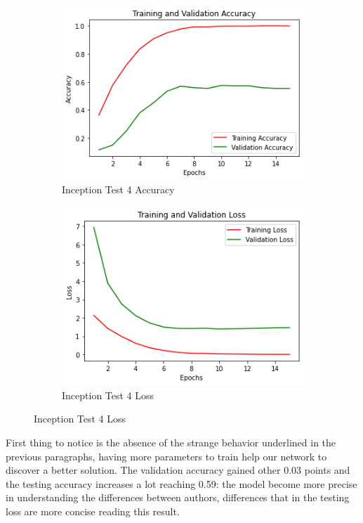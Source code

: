 \begin{figure}[H]
	\begin{subfigure}{0.5\textwidth}
		\includegraphics[width=0.9\linewidth]{img/inception/inceptionft3acc.png} 
		\caption{Inception Test 4 Accuracy}
		\label{fig:inceptionft3acc}
	\end{subfigure}
	\begin{subfigure}{0.5\textwidth}
		\includegraphics[width=0.9\linewidth]{img/inception/inceptionft3loss.png}
		\caption{Inception Test 4 Loss}
		\label{fig:inceptionft3loss}
	\end{subfigure}
\end{figure}

First thing to notice is the absence of the strange behavior underlined in the previous paragraphs, having more parameters to train help our network to discover a better solution. The validation accuracy gained other 0.03 points and the testing accuracy increases a lot reaching 0.59: the model become more precise in understanding the differences between authors, differences that in the testing loss are more concise reading this result.

